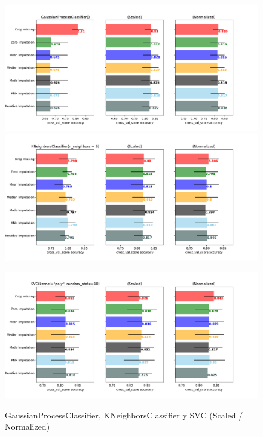 \documentclass[12pt,twoside]{report}
\begin{document}
\begin{figure}[ht!p]
\caption{GaussianProcessClassifier, KNeighborsClassifier y SVC (Scaled / Normalized)}
\includegraphics[width=\textwidth]{./code/figures_python/imputation_techniques/imputation_techniques_gpc_scaled_minmax.pdf}%

\includegraphics[width=\textwidth]{./code/figures_python/imputation_techniques/imputation_techniques_knn_scaled_minmax.pdf}

\includegraphics[width=\textwidth]{./code/figures_python/imputation_techniques/imputation_techniques_svc_poly_scaled_minmax.pdf}
\label{imputation-scaled-2}
\end{figure}
\end{document}
